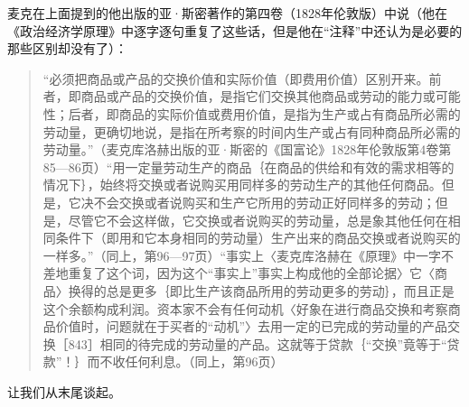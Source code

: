 麦克在上面提到的他出版的亚·斯密著作的第四卷（1828年伦敦版）中说（他在《政治经济学原理》中逐字逐句重复了这些话，但是他在“注释”中还认为是必要的那些区别却没有了）：

\begin{quote}{“必须把商品或产品的交换价值和实际价值（即费用价值）区别开来。前者，即商品或产品的交换价值，是指它们交换其他商品或劳动的能力或可能性；后者，即商品的实际价值或费用价值，是指为生产或占有商品所必需的劳动量，更确切地说，是指在所考察的时间内生产或占有同种商品所必需的劳动量。”（麦克库洛赫出版的亚·斯密的《国富论》1828年伦敦版第4卷第85—86页）“用一定量劳动生产的商品｛在商品的供给和有效的需求相等的情况下｝，始终将交换或者说购买用同样多的劳动生产的其他任何商品。但是，它决不会交换或者说购买和生产它所用的劳动正好同样多的劳动；但是，尽管它不会这样做，它交换或者说购买的劳动量，总是象其他任何在相同条件下（即用和它本身相同的劳动量）生产出来的商品交换或者说购买的一样多。”（同上，第96—97页）“事实上〈麦克库洛赫在《原理》中一字不差地重复了这个词，因为这个“事实上”事实上构成他的全部论据〉它〈商品〉换得的总是更多｛即比生产该商品所用的劳动更多的劳动｝，而且正是这个余额构成利润。资本家不会有任何动机〈好象在进行商品交换和考察商品价值时，问题就在于买者的“动机”〉去用一定的已完成的劳动量的产品交换［843］相同的待完成的劳动量的产品。这就等于贷款｛“交换”竟等于“贷款”！｝而不收任何利息。（同上，第96页）}\end{quote}

让我们从末尾谈起。

